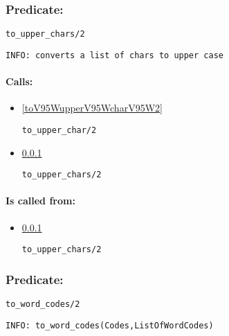 \subsubsection{Predicate:} \label{toV95WupperV95WcharsV95W2}

\begin{verbatim}
to_upper_chars/2
\end{verbatim}

{\small \begin{verbatim}
INFO: converts a list of chars to upper case

\end{verbatim}}
\paragraph{Calls:} 
\begin{itemize}
\item \ref{toV95WupperV95WcharV95W2} 
\begin{verbatim}
to_upper_char/2
\end{verbatim}

\item \ref{toV95WupperV95WcharsV95W2} 
\begin{verbatim}
to_upper_chars/2
\end{verbatim}

\end{itemize}
\paragraph{Is called from:} 
\begin{itemize}
\item \ref{toV95WupperV95WcharsV95W2} 
\begin{verbatim}
to_upper_chars/2
\end{verbatim}

\end{itemize}

\subsubsection{Predicate:} \label{toV95WwordV95WcodesV95W2}

\begin{verbatim}
to_word_codes/2
\end{verbatim}

{\small \begin{verbatim}
INFO: to_word_codes(Codes,ListOfWordCodes)

\end{verbatim}}
